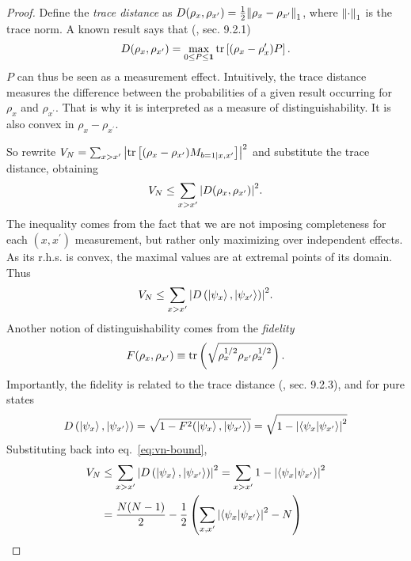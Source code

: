     \moremeasurements*
    \begin{proof}
        Define the \emph{trace distance} as $D(\rho_x, \rho_{x^\prime}) = \frac{1}{2} \norm{\rho_x - \rho_{x^\prime}}_1$, where $\norm{\cdot}_1$ is the trace norm. A known result says that (\cite{nielsen_chuang_book}, sec. 9.2.1)
        $$
            D(\rho_x, \rho_{x^\prime}) = \max_{0 \leq P \leq \mathbf{1}} \text{tr}\left[ (\rho_x - \rho_x^{\prime}) P \right] .
        $$
        $P$ can thus be seen as a measurement effect. Intuitively, the trace distance measures the difference between the probabilities of a given result occurring for $\rho_x$ and $\rho_{x^\prime}$. That is why it is interpreted as a measure of distinguishability. It is also convex in $\rho_x - \rho_{x^\prime}$.

        So rewrite $V_N = \sum_{x > x^\prime} \abs{ \text{tr}\left[ (\rho_x - \rho_{x^\prime}) M_{b=1 \mid x,x^\prime} \right]}^2$ and substitute the trace distance, obtaining
        $$
            V_N \leq \sum_{x > x^\prime} \abs{ D(\rho_x, \rho_{x^\prime}) }^2 .
        $$
        The inequality comes from the fact that we are not imposing completeness for each $(x,x^\prime)$ measurement, but rather only maximizing over independent effects. As its r.h.s. is convex, the maximal values are at extremal points of its domain. Thus
        \begin{equation}
            V_N \leq \sum_{x > x^\prime} \abs{ D\left( \ket{\psi_x}, \ket{\psi_{x^\prime}} \right) }^2 .
            \label{eq:vn-bound}
        \end{equation}
        Another notion of distinguishability comes from the \emph{fidelity}
        $$
            F(\rho_x, \rho_{x^\prime}) \equiv \text{tr}\left( \sqrt{\rho_x^{1/2} \rho_{x^\prime} \rho_x^{1/2}} \right).
        $$
        Importantly, the fidelity is related to the trace distance (\cite{nielsen_chuang_book}, sec. 9.2.3), and for pure states   
        $$
            D\left( \ket{\psi_x}, \ket{\psi_{x^\prime}} \right) = \sqrt{1 - F^2(\ket{\psi_x}, \ket{\psi_{x^\prime}})} = \sqrt{1 - \abs{\braket{\psi_x}{\psi_{x^\prime}}}^2}
        $$
        Substituting back into eq.~\eqref{eq:vn-bound},
        \begin{align*}
            V_N & \leq \sum_{x > x^\prime} \abs{ D\left( \ket{\psi_x}, \ket{\psi_{x^\prime}} \right) }^2
            = \sum_{x > x^\prime} 1 - \abs{\braket{\psi_x}{\psi_{x^\prime}}}^2 \\
            &= \frac{N(N-1)}{2} - \frac{1}{2} \left( \sum_{x, x^\prime} \abs{\braket{\psi_x}{\psi_{x^\prime}}}^2 - N \right) \\

\end{align*}
\end{proof}
